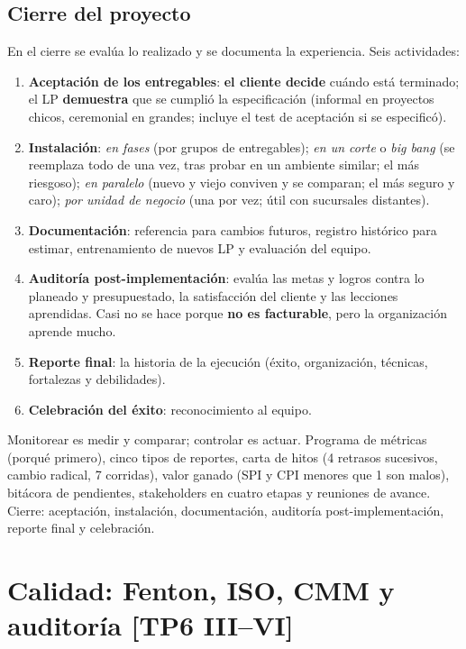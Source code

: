 \documentclass[11pt,a4paper]{article}
\begin{document}
\subsection{Cierre del proyecto}
En el cierre se evalúa lo realizado y se documenta la experiencia. Seis actividades:
\begin{enumerate}
  \item \textbf{Aceptación de los entregables}: \textbf{el cliente decide} cuándo está terminado; el LP
  \textbf{demuestra} que se cumplió la especificación (informal en proyectos chicos, ceremonial en grandes;
  incluye el test de aceptación si se especificó).
  \item \textbf{Instalación}: \emph{en fases} (por grupos de entregables); \emph{en un corte} o \emph{big bang}
  (se reemplaza todo de una vez, tras probar en un ambiente similar; el más riesgoso); \emph{en paralelo} (nuevo
  y viejo conviven y se comparan; el más seguro y caro); \emph{por unidad de negocio} (una por vez; útil con
  sucursales distantes).
  \item \textbf{Documentación}: referencia para cambios futuros, registro histórico para estimar, entrenamiento
  de nuevos LP y evaluación del equipo.
  \item \textbf{Auditoría post-implementación}: evalúa las metas y logros contra lo planeado y presupuestado,
  la satisfacción del cliente y las lecciones aprendidas. Casi no se hace porque \textbf{no es facturable}, pero
  la organización aprende mucho.
  \item \textbf{Reporte final}: la historia de la ejecución (éxito, organización, técnicas, fortalezas y
  debilidades).
  \item \textbf{Celebración del éxito}: reconocimiento al equipo.
\end{enumerate}

\begin{enresumen}
Monitorear es medir y comparar; controlar es actuar. Programa de métricas (porqué primero), cinco tipos de
reportes, carta de hitos (4 retrasos sucesivos, cambio radical, 7 corridas), valor ganado (SPI y CPI menores que
1 son malos), bitácora de pendientes, stakeholders en cuatro etapas y reuniones de avance. Cierre: aceptación,
instalación, documentación, auditoría post-implementación, reporte final y celebración.
\end{enresumen}

\section[Calidad: Fenton, ISO, CMM y auditoría]{Calidad: Fenton, ISO, CMM y auditoría \hfill {\normalsize [TP6 III--VI]}}
\end{document}
